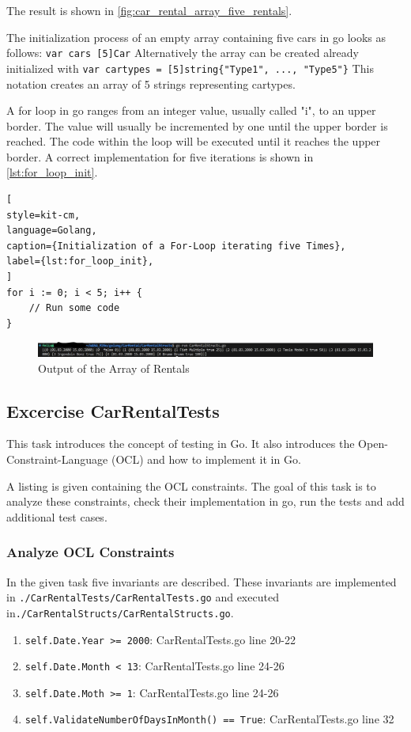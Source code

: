 The result is shown in \autoref{fig:car_rental_array_five_rentals}.

The initialization process of an empty array containing five cars in go looks as follows: \texttt{var cars [5]Car}
Alternatively the array can be created already initialized with \texttt{var cartypes = [5]string\{"Type1", ..., "Type5"\}}
This notation creates an array of 5 strings representing cartypes.

A for loop in go ranges from an integer value, usually called "i", to an upper border.
The value will usually be incremented by one until the upper border is reached. 
The code within the loop will be executed until it reaches the upper border.
A correct implementation for five iterations is shown in \autoref{lst:for_loop_init}.

\begin{lstlisting}[
style=kit-cm,
language=Golang,
caption={Initialization of a For-Loop iterating five Times},
label={lst:for_loop_init},
]
for i := 0; i < 5; i++ {
    // Run some code
}
\end{lstlisting}

\begin{figure}[H]
\centering
\includegraphics[width=\textwidth]{figures/goLang/carRental/carRental_arrayFiveRentals.png}
\caption{Output of the Array of Rentals}
\label{fig:car_rental_array_five_rentals}
\end{figure}

\subsection{Excercise CarRentalTests}
\label{sec:car_rental_tests}
This task introduces the concept of testing in Go.
It also introduces the Open-Constraint-Language (OCL) and how to implement it in Go.

A listing is given containing the OCL constraints.
The goal of this task is to analyze these constraints, check their implementation in go, run the tests and add additional test cases.

\subsubsection*{Analyze OCL Constraints}
In the given task five invariants are described.
These invariants are implemented in \texttt{./CarRentalTests/CarRentalTests.go} and executed in\hfill \linebreak \texttt{./CarRentalStructs/CarRentalStructs.go}.
\begin{enumerate}
    \item \texttt{self.Date.Year >= 2000}: CarRentalTests.go line 20-22
    \item \texttt{self.Date.Month < 13}: CarRentalTests.go line 24-26
    \item \texttt{self.Date.Moth >= 1}: CarRentalTests.go line 24-26
    \item \texttt{self.ValidateNumberOfDaysInMonth() == True}: CarRentalTests.go line 32
\end{enumerate}

